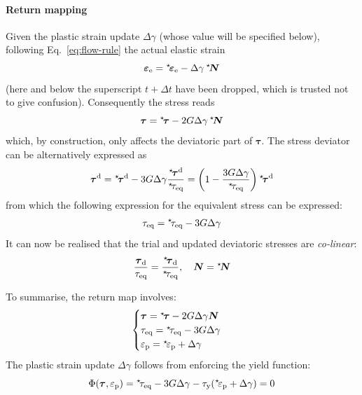 \documentclass{goose-article}
\newcommand\ST[1]{\hspace*{-.3em}~^\star\!#1}
\newcommand\T[1]{\bm{{#1}}}
\begin{document}
\paragraph{Return mapping}

Given the plastic strain update $\Delta \gamma$ (whose value will be specified below),
following Eq.~\eqref{eq:flow-rule} the actual elastic strain
\begin{equation}
    \T{\varepsilon}_\mathrm{e} = \ST{\T{\varepsilon}}_\mathrm{e} - \Delta \gamma \,\ST{\T{N}}
\end{equation}
(here and below the superscript $t + \Delta t$ have been dropped,
which is trusted not to give confusion).
Consequently the stress reads
\begin{equation}
    \T{\tau} = \ST{\T{\tau}} - 2 G \Delta \gamma \, \ST{\T{N}}
\end{equation}
which, by construction, only affects the deviatoric part of $\T{\tau}$.
The stress deviator can be alternatively expressed as
\begin{equation}
    \T{\tau}^\mathrm{d}
    = \ST{\T{\tau}}^\mathrm{d}
    - 3 G \Delta \gamma \frac{\ST{\T{\tau}}^\mathrm{d}}{\ST{\tau}_\mathrm{eq}}
    = \left( 1 - \frac{3 G \Delta \gamma }{\ST{\tau}_\mathrm{eq}} \right) \ST{\T{\tau}}^\mathrm{d}
\end{equation}
from which the following expression for the equivalent stress can be expressed:
\begin{equation}
    \tau_\mathrm{eq} = \ST{\tau}_\mathrm{eq} - 3 G \Delta \gamma
\end{equation}
It can now be realised that the trial and updated deviatoric stresses are \emph{co-linear}:
\begin{equation}
    \frac{ \T{\tau}_\mathrm{d} }{ \tau_\mathrm{eq} }
    =
    \frac{ \ST{\T{\tau}}_\mathrm{d} }{ \ST{\tau}_\mathrm{eq} }, \quad
    \T{N} = \ST{\T{N}}
\end{equation}

To summarise, the return map involves:
\begin{equation}
    \begin{cases}
        \T{\tau} = \ST{\T{\tau}} - 2 G \Delta \gamma \T{N}
        \\
        \tau_\mathrm{eq} = \ST{\tau}_\mathrm{eq} - 3 G \Delta \gamma
        \\
        \varepsilon_\mathrm{p} = \ST{\varepsilon}_\mathrm{p} + \Delta \gamma
    \end{cases}
\end{equation}
The plastic strain update $\Delta \gamma$ follows from enforcing the yield function:
\begin{equation}
    \Phi(\T{\tau}, \varepsilon_\mathrm{p})
    = \ST{\tau}_\mathrm{eq}
    - 3 G \Delta \gamma - \tau_\mathrm{y} ( \ST{\varepsilon}_\mathrm{p} + \Delta \gamma ) = 0
    \label{eq:return-map:yield-function}
\end{equation}
\end{document}
